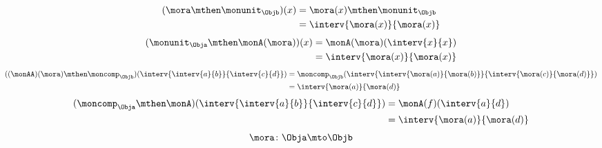 {\begin{forslides}
		\begin{equation*}
			\label{eq:arrow_1}
			\begin{aligned}
				(\mora \mthen \monunit_\Objb)(x)
				 & =\mora(x)\mthen \monunit_\Objb \\
				 & =\interv{\mora(x)}{\mora(x)}
			\end{aligned}
		\end{equation*}
		\begin{equation*}
			\label{eq:arrow_2}
			\begin{aligned}
				(\monunit_\Obja \mthen \monA(\mora))(x)
				 & =\monA(\mora)(\interv{x}{x}) \\
				 & =\interv{\mora(x)}{\mora(x)}
			\end{aligned}
		\end{equation*}
		\begin{equation*}
			\label{eq:arrow_3}
			\begin{aligned}
				((\monAA)(\mora)\mthen \moncomp_\Objb)(\interv{\interv{a}{b}}{\interv{c}{d}}) & =\moncomp_\Objb(\interv{\interv{\mora(a)}{\mora(b)}}{\interv{\mora(c)}{\mora(d)}}) \\
				                                                                              & =\interv{\mora(a)}{\mora(d)}
			\end{aligned}
		\end{equation*}
		\begin{equation*}
			\label{eq:arrow_4}
			\begin{aligned}
				(\moncomp_\Obja\mthen \monA)(\interv{\interv{a}{b}}{\interv{c}{d}})
				 & =\monA(f)(\interv{a}{d})     \\
				 & =\interv{\mora(a)}{\mora(d)}
			\end{aligned}
		\end{equation*}
		\begin{equation*}
			\label{eq:arrow_5}
			\mora\colon \Obja \mto \Objb
		\end{equation*}
	\end{forslides}
}
